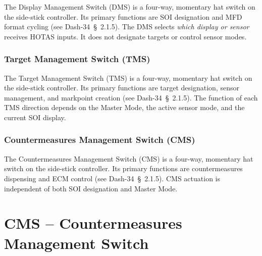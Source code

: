 \documentclass[11pt, a4paper, twoside]{report}
\newcommand{\dashref}[1]{Dash-34~\S~#1}
\begin{document}
The Display Management Switch (DMS) is a four-way, momentary hat switch on the side-stick controller. Its primary functions are SOI designation and MFD format cycling (see \dashref{2.1.5}). The DMS selects \textit{which display or sensor} receives HOTAS inputs. It does not designate targets or control sensor modes.

\subsection{Target Management Switch (TMS)}
\label{sec:C2-S3-S2}

The Target Management Switch (TMS) is a four-way, momentary hat switch on the side-stick controller. Its primary functions are target designation, sensor management, and markpoint creation (see \dashref{2.1.5}). The function of each TMS direction depends on the Master Mode, the active sensor mode, and the current SOI display.

\subsection{Countermeasures Management Switch (CMS)}
\label{sec:C2-S3-S3}

The Countermeasures Management Switch (CMS) is a four-way, momentary hat switch on the side-stick controller. Its primary functions are countermeasures dispensing and ECM control (see \dashref{2.1.5}). CMS actuation is independent of both SOI designation and Master Mode.

\chapter{CMS – Countermeasures Management Switch}
\label{chap:C5}

\end{document}
